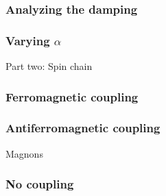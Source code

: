 \documentclass{beamer}
\begin{document}
\begin{frame}
    \frametitle{Analyzing the damping}
\begin{figure}
    \centering
    
\end{figure}
\end{frame}

\begin{frame}
    \frametitle{Varying $\alpha$}
\begin{figure}
    \centering
    
\end{figure}
\end{frame}



\begin{frame}
    \vfill
    \centering
    Part two: Spin chain
    \vfill
\end{frame}


\begin{frame}
    \frametitle{Ferromagnetic coupling}
\begin{figure}
    \centering
    
\end{figure}
\end{frame}

\begin{frame}
    \frametitle{Antiferromagnetic coupling}
\begin{figure}
    \centering
    
\end{figure}
\end{frame}

\begin{frame}
    \vfill
    \centering
    Magnons
    \vfill
\end{frame}

\begin{frame}
    \frametitle{No coupling}
\begin{figure}
    \centering
    
\end{figure}
\end{frame}
\end{document}
